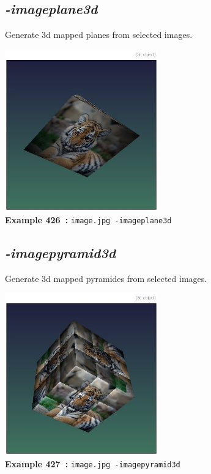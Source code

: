 \documentclass[a4paper,11pt,twoside]{book}
\begin{document}
\subsection{\emph{-imageplane3d} }\vspace*{-0.5em}
Generate 3d mapped planes from selected images.
\begin{center}\includegraphics[keepaspectratio=true,height=7cm,width=\textwidth]{img/gmic_def426.jpg}\\
{\footnotesize \textbf{Example 426~:} \texttt{image.jpg -imageplane3d}}
\end{center}

\subsection{\emph{-imagepyramid3d} }\vspace*{-0.5em}
Generate 3d mapped pyramides from selected images.
\begin{center}\includegraphics[keepaspectratio=true,height=7cm,width=\textwidth]{img/gmic_def427.jpg}\\
{\footnotesize \textbf{Example 427~:} \texttt{image.jpg -imagepyramid3d}}
\end{center}
\end{document}
